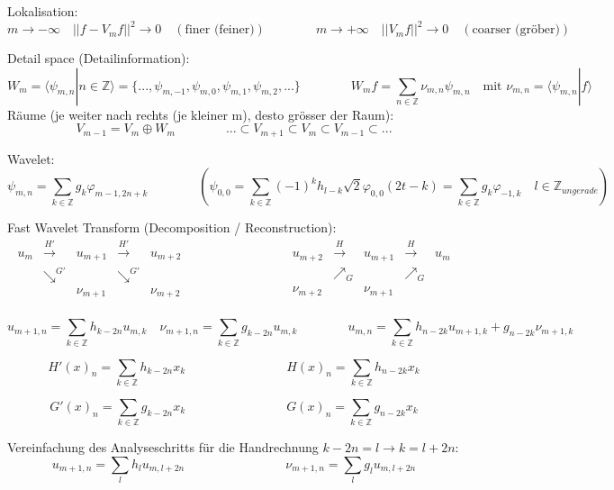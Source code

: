 Lokalisation:
\[  
	m \rightarrow -\infty \quad ||f-V_mf||^2 \rightarrow 0 \quad (\text{finer (feiner)})
	\qquad \qquad
	m \rightarrow +\infty \quad ||V_mf||^2 \rightarrow 0 \quad (\text{coarser (gröber)})
\]

Detail space (Detailinformation):
\[
	W_m = \langle \psi_{m,n} | n \in \mathbb{Z} \rangle = \{ ...,\psi_{m,-1},\psi_{m,0}, \psi_{m,1}, \psi_{m,2},... \}
	\qquad \qquad
	W_mf = \sum_{n \in \mathbb{Z}} \nu_{m,n}\psi_{m,n} \quad \text{mit } \nu_{m,n}=\langle \psi_{m,n}|f \rangle
\]
Räume (je weiter nach rechts (je kleiner m), desto grösser der Raum):
\[ V_{m-1} = V_m \oplus W_m  \qquad \qquad ...\subset V_{m+1} \subset V_{m} \subset V_{m-1} \subset ... \]

Wavelet:
\[
	\psi_{m,n} = \sum_{k \in \mathbb{Z}} g_k \varphi_{m-1,2n+k} 
	\qquad \qquad 
	\left(\psi_{0,0}=\sum_{k \in \mathbb{Z}} (-1)^k h_{l-k} \sqrt{2}  \varphi_{0,0}(2t-k) = \sum_{k \in \mathbb{Z}} g_k \varphi_{-1,k} \quad l \in \mathbb{Z}_{ungerade} \right)
\]

Fast Wavelet Transform (Decomposition / Reconstruction):
\[
	\boxed{\begin{array}{ccccc}
		u_m & \xrightarrow{H'} & u_{m+1} & \xrightarrow{H'} & u_{m+2} \\
		& \searrow^{G'} & & \searrow^{G'} & \\
		& & \nu_{m+1} & & \nu_{m+2} \\
	\end{array}}
	\qquad \qquad \qquad \qquad
	\boxed{\begin{array}{ccccc}
		u_{m+2} & \xrightarrow{H} & u_{m+1} & \xrightarrow{H} & u_{m} \\
		& \nearrow_G & & \nearrow_G & \\
		\nu_{m+2}& & \nu_{m+1} & & \\
	\end{array}}
\]

\[  
	u_{m+1,n} = \sum_{k \in  \mathbb{Z}} h_{k-2n} u_{m,k} \quad \nu_{m+1,n} = \sum_{k \in  \mathbb{Z}} g_{k-2n} u_{m,k}
	\qquad \qquad
	u_{m,n} = \sum_{k \in  \mathbb{Z}} h_{n-2k} u_{m+1,k} + g_{n-2k} \nu_{m+1,k}
\]

\[
	H'(x)_n = \sum_{k \in  \mathbb{Z}} h_{k-2n} x_k
	\qquad \qquad \qquad \qquad
	H(x)_n = \sum_{k \in  \mathbb{Z}} h_{n-2k} x_k
\]

\[
	G'(x)_n = \sum_{k \in  \mathbb{Z}} g_{k-2n} x_k
	\qquad \qquad \qquad \qquad
	G(x)_n = \sum_{k \in  \mathbb{Z}} g_{n-2k} x_k
\]


Vereinfachung des Analyseschritts für die Handrechnung $k-2n=l\rightarrow k=l+2n$:
\[ 
	u_{m+1,n} = \sum_{l} h_{l} u_{m,l+2n}
	\qquad \qquad \qquad \qquad
	\nu_{m+1,n} = \sum_{l} g_{l} u_{m,l+2n}
\]


